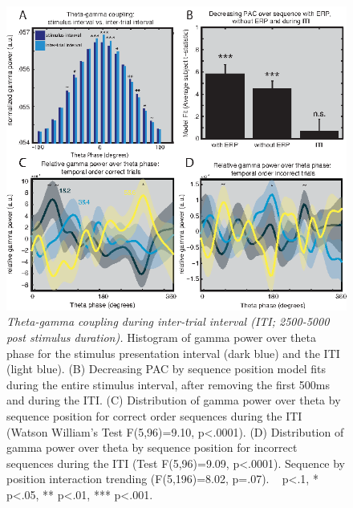 \begin{figure}
  \centering
  \includegraphics[width=\textwidth]{figures/chapter3_suppfigure11.eps}
  \caption[Theta-gamma coupling during inter-trial interval]{\textit{Theta-gamma coupling during inter-trial interval (ITI; 2500-5000 post stimulus duration).} Histogram of gamma power over theta phase for the stimulus presentation interval (dark blue) and the ITI (light blue). (B) Decreasing PAC by sequence position model fits during the entire stimulus interval, after removing the first 500ms and during the ITI. (C) Distribution of gamma power over theta by sequence position for correct order sequences during the ITI (Watson William’s Test F(5,96)=9.10, p<.0001). (D) Distribution of gamma power over theta by sequence position for incorrect sequences during the ITI (Test F(5,96)=9.09, p<.0001). Sequence by position interaction trending (F(5,196)=8.02, p=.07). ~ p<.1, * p<.05, ** p<.01, *** p<.001.}
  \label{chapter3_suppfigure11}
\end{figure}

